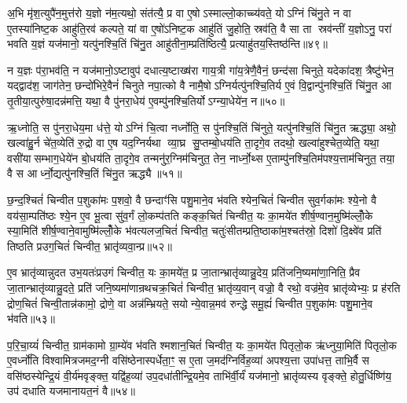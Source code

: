 अ॒भि मृ॑श॒त्युपै॑न॒मुत्त॑रो य॒ज्ञो न॑म॒त्यथो॒ संत॑त्यै॒ प्र वा ए॒षोऽस्माल्लो॒काच्च्य॑वते॒ योऽग्निं चि॑नु॒ते न वा ए॒तस्या॑निष्ट॒क आहु॑ति॒रव॑ कल्पते॒ यां वा ए॒षो॑ऽनिष्ट॒क आहु॑तिं जु॒होति॒ स्रव॑ति॒ वै सा ता स्रव॑न्तीं य॒ज्ञोऽनु॒ परा॑ भवति य॒ज्ञं यज॑मानो॒ यत्पु॑नश्चि॒तिं चि॑नु॒त आहु॑तीना॒म्प्रति॑ष्ठित्यै॒ प्रत्याहु॑तय॒स्तिष्ठ॑न्ति॥४९॥

न य॒ज्ञः प॑रा॒भव॑ति॒ न यज॑मानो॒ऽष्टावुप॑ दधात्य॒ष्टाख्ष॑रा गाय॒त्री गा॑य॒त्रेणै॒वैनं॒ छन्द॑सा चिनुते॒ यदेका॑दश॒ त्रैष्टु॑भेन॒ यद्द्वाद॑श॒ जाग॑तेन॒ छन्दो॑भिरे॒वैनं॑ चिनुते नपा॒त्को वै नामै॒षोऽग्निर्यत्पु॑नश्चि॒तिर्य ए॒वं वि॒द्वान्पु॑नश्चि॒तिं चि॑नु॒त आ तृ॒तीया॒त्पुरु॑षा॒दन्न॑मत्ति॒ यथा॒ वै पु॑नरा॒धेय॑ ए॒वम्पु॑नश्चि॒तिर्योऽग्न्या॒धेये॑न॒ न॥५०॥

ऋ॒ध्नोति॒ स पु॑नरा॒धेय॒मा ध॑त्ते॒ योऽग्निं चि॒त्वा नर्ध्नोति॒ स पु॑नश्चि॒तिं चि॑नुते॒ यत्पु॑नश्चि॒तिं चि॑नु॒त ऋद्ध्या॒ अथो॒ खल्वा॑हु॒र्न चे॑त॒व्येति॑ रु॒द्रो वा ए॒ष यद॒ग्निर्यथा व्या॒घ्र सु॒प्तम्बो॒धय॑ति ता॒दृगे॒व तदथो॒ खल्वा॑हुश्चेत॒व्येति॒ यथा॒ वसी॑यासम्भाग॒धेये॑न बो॒धय॑ति ता॒दृगे॒व तन्मनु॑र॒ग्निम॑चिनुत॒ तेन॒ नार्ध्नो॒थ्स ए॒ताम्पु॑नश्चि॒तिम॑पश्य॒त्ताम॑चिनुत॒ तया॒ वै स आर्ध्नो॒द्यत्पु॑नश्चि॒तिं चि॑नु॒त ऋद्ध्यै॥५१॥

{\anuvakamend[{त्रि॒वृदथ॒ तिष्ठ॑न्त्यग्न्या॒धेये॑न॒ नाचि॑नुत स॒प्तद॑श च॥10॥}]}

छ॒न्द॒श्चितं॑ चिन्वीत प॒शुका॑मः प॒शवो॒ वै छन्दाꣳ॑सि पशु॒माने॒व भ॑वति श्येन॒चितं॑ चिन्वीत सुव॒र्गका॑मः श्ये॒नो वै वय॑सा॒म्पति॑ष्ठः श्ये॒न ए॒व भू॒त्वा सु॑व॒र्गं लो॒कम्प॑तति कङ्क॒चितं॑ चिन्वीत॒ यः का॒मये॑त शीर्\mbox{}ष॒ण्वान॒मुष्मि॑ल्लोँ॒के स्या॒मिति॑ शीर्\mbox{}ष॒ण्वाने॒वामुष्मि॑ल्लोँ॒के भ॑वत्यलज॒चितं॑ चिन्वीत॒ चतुः॑सीतम्प्रति॒ष्ठाका॑म॒श्चत॑स्रो॒ दिशो॑ दि॒क्ष्वे॑व प्रति॑ तिष्ठति प्रउग॒चितं॑ चिन्वीत॒ भ्रातृ॑व्यवा॒न्प्र॥५२॥

ए॒व भ्रातृ॑व्यान्नुदत उभ॒यतः॑प्रउगं चिन्वीत॒ यः का॒मये॑त॒ प्र जा॒तान्भ्रातृ॑व्यान्नु॒देय॒ प्रति॑जनि॒ष्यमा॑णा॒निति॒ प्रैव जा॒तान्भ्रातृ॑व्यान्नु॒दते॒ प्रति॑ जनि॒ष्यमा॑णान्रथचक्र॒चितं॑ चिन्वीत॒ भ्रातृ॑व्य॒वान् वज्रो॒ वै रथो॒ वज्र॑मे॒व भ्रातृ॑व्येभ्यः॒ प्र ह॑रति द्रोण॒चितं॑ चिन्वी॒तान्न॑कामो॒ द्रोणे॒ वा अन्न॑म्भ्रियते॒ सयोन्ये॒वान्न॒मव॑ रुन्द्धे समू॒ह्यं॑ चिन्वीत प॒शुका॑मः पशु॒माने॒व भ॑वति॥५३॥

प॒रि॒चा॒य्यं॑ चिन्वीत॒ ग्राम॑कामो ग्रा॒म्ये॑व भ॑वति श्मशान॒चितं॑ चिन्वीत॒ यः का॒मये॑त पितृलो॒क ऋ॑ध्नुया॒मिति॑ पितृलो॒क ए॒वर्ध्नो॑ति विश्वामित्रजमद॒ग्नी वसि॑ष्ठेनास्पर्धेता॒ꣳ॒ स ए॒ता ज॒मद॑ग्निर्विह॒व्या॑ अपश्य॒त्ता उपा॑धत्त॒ ताभि॒र्वै स वसि॑ष्ठस्येन्द्रि॒यं वी॒र्य॑मवृङ्क्त॒ यद्वि॑ह॒व्या॑ उप॒दधा॑तीन्द्रि॒यमे॒व ताभि॑र्वी॒र्यं॑ यज॑मानो॒ भ्रातृ॑व्यस्य वृङ्क्ते॒ होतु॒र्धिष्णि॑य॒ उप॑ दधाति यजमानायत॒नं वै॥५४॥

